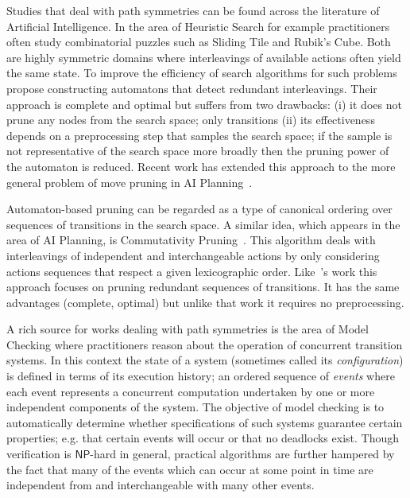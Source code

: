 Studies that deal with path symmetries can be found across the literature of
Artificial Intelligence.  In the area of Heuristic Search for example
practitioners often study combinatorial puzzles such as Sliding Tile and
Rubik's Cube. Both are highly symmetric domains where interleavings of
available actions often yield the same state. To improve the efficiency of
search algorithms for such problems ~\cite{taylor93} propose constructing
automatons that detect redundant interleavings.  Their approach is complete
and optimal but suffers from two drawbacks: (i) it does not prune any nodes
from the search space; only transitions (ii) its effectiveness depends on a
preprocessing step that samples the search space; if the sample is not
representative of the search space more broadly then the pruning power of the
automaton is reduced. Recent work has extended this approach to the more
general problem of move pruning in AI Planning~\cite{DBLP:conf/socs/BurchH12}.

Automaton-based pruning can be regarded as a type of canonical ordering over
sequences of transitions in the search space. A similar idea, which appears in
the area of AI Planning, is Commutativity Pruning~\citep{haslum00}. This
algorithm deals with interleavings of independent and interchangeable actions
by only considering actions sequences that respect a given lexicographic
order. Like~\cite{taylor93}'s work this approach focuses on pruning redundant
sequences of transitions.  It has the same advantages (complete, optimal) but
unlike that work it requires no preprocessing.

A rich source for works dealing with path symmetries is the area
of Model Checking where practitioners reason about the operation of concurrent
transition systems.  In this context the state of a system (sometimes called
its \emph{configuration}) is defined in terms of its execution history; an
ordered sequence of \emph{events} where each event represents a concurrent
computation undertaken by one or more independent components of the system.
The objective of model checking is to automatically determine whether
specifications of such systems guarantee certain properties; e.g.  that
certain events will occur or that no deadlocks exist.  Though verification is
$\mathsf{NP}$-hard in general, practical algorithms are further hampered by
the fact that many of the events which can occur at some point in time are
independent from and interchangeable with many other events. 

